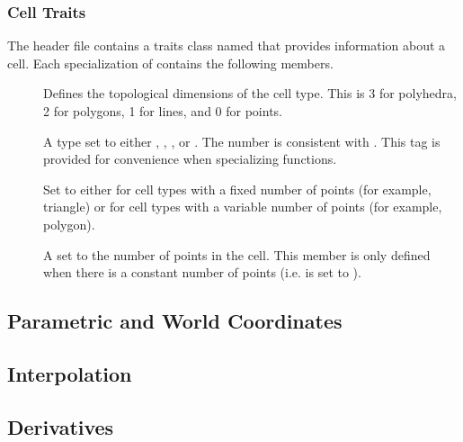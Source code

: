 
\subsubsection{Cell Traits}


The  header file contains a traits class
named  that provides information about a cell. Each
specialization of  contains the following
members.

\begin{description}
\item[] Defines the topological
  dimensions of the cell type. This is 3 for polyhedra, 2 for polygons, 1
  for lines, and 0 for points.
\item[] A type set to either
  ,
  ,
  , or
  . The number
  is consistent with . This tag is
  provided for convenience when specializing functions.
\item[] Set to either 
  for cell types with a fixed number of points (for example, triangle) or
   for cell types with a variable number of
  points (for example, polygon).
\item[] A  set to the number of
  points in the cell. This member is only defined when there is a constant
  number of points (i.e.  is set to
  ).
\end{description}




\subsection{Parametric and World Coordinates}

\subsection{Interpolation}

\subsection{Derivatives}
